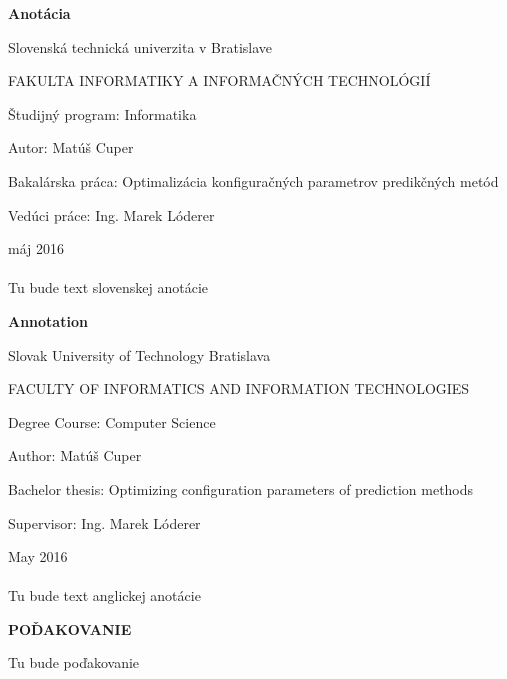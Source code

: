 \documentclass[a4paper,slovak,12pt,appendix]{article}
\begin{document}
\newpage
\thispagestyle{plain}
\vspace*{1.5cm}
\begin{center}
  \begin{Large}
    \textbf{Anotácia} \par
  \end{Large}
\end{center}
{Slovenská technická univerzita v Bratislave \par}
{FAKULTA INFORMATIKY A INFORMAČNÝCH TECHNOLÓGIÍ \par}
{Študijný program: Informatika \par}
{Autor: Matúš Cuper \par}
{Bakalárska práca: Optimalizácia konfiguračných parametrov predikčných metód \par}
{Vedúci práce: Ing. Marek Lóderer \par}
{máj 2016 \\} \\
Tu bude text slovenskej anotácie

\newpage
\thispagestyle{plain}
\vspace*{1.5cm}
\begin{center}
  \begin{Large}
    \textbf{Annotation} \par
  \end{Large}
\end{center}
{Slovak University of Technology Bratislava \par}
{FACULTY OF INFORMATICS AND INFORMATION TECHNOLOGIES \par}
{Degree Course: Computer Science \par}
{Author: Matúš Cuper \par}
{Bachelor thesis: Optimizing configuration parameters of prediction methods \par}
{Supervisor: Ing. Marek Lóderer \par}
{May 2016 \\} \\
Tu bude text anglickej anotácie


\newpage
\thispagestyle{plain}
\vspace*{15cm}
\begin{large}
  \noindent \textbf{POĎAKOVANIE} \\
\end{large}
\noindent
Tu bude poďakovanie
\end{document}
